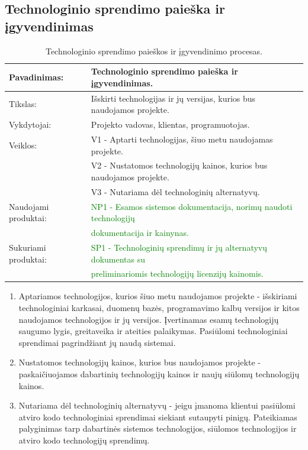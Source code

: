 \documentclass{VUMIFPSkursinis}
\begin{document}
	\subsection{Technologinio sprendimo paieška ir įgyvendinimas}
	\begin{center}
		\begin{table}[ht]
			\caption{Technologinio sprendimo paieškos ir įgyvendinimo procesas.}
			\begin{tabular}{ | l | l | }
				\hline
				Pavadinimas:		& Technologinio sprendimo paieška ir įgyvendinimas.									\\ \hline
				Tikslas:		& Išskirti technologijas ir jų versijas, kurios bus naudojamos projekte. 						\\ \hline
				Vykdytojai:		& Projekto vadovas, klientas, programuotojas.										\\ \hline
				Veiklos:		& V1 - Aptarti technologijas, šiuo metu naudojamas projekte. 								\\
							& V2 - Nustatomos technologijų kainos, kurios bus naudojamos projekte.							\\
							& V3 - Nutariama dėl technologinių alternatyvų.										\\ \hline
				Naudojami produktai:	& \textcolor{green}{NP1 - Esamos sistemos dokumentacija, norimų naudoti technologijų} \\& \textcolor{green}{dokumentacija ir kainynas. 	}		\\ \hline
				Sukuriami produktai:	& \textcolor{green}{SP1 - Technologinių sprendimų ir jų alternatyvų dokumentas su} \\& \textcolor{green}{preliminariomis technologijų licenzijų kainomis.}	\\ \hline
			\end{tabular}
		\end{table}
	\end{center}
	\newpage
	\begin{enumerate}
		\item{
			Aptariamos technologijos, kurios šiuo metu naudojamos projekte - išskiriami technologiniai karkasai, duomenų bazės, programavimo kalbų versijos ir kitos naudojamos technologijos ir jų versijos.
			Įvertinamas esamų technologijų saugumo lygis, greitaveika ir ateities palaikymas.
			Pasiūlomi technologiniai sprendimai pagrindžiant jų naudą sistemai.
		}
		\item{Nustatomos technologijų kainos, kurios bus naudojamos projekte - paskaičiuojamos dabartinių technologijų kainos ir naujų siūlomų technologijų kainos.}
		\item{
			Nutariama dėl technologinių alternatyvų - jeigu įmanoma klientui pasiūlomi atviro kodo technologiniai sprendimai siekiant sutaupyti pinigų.
			Pateikiamas palyginimas tarp dabartinės sistemos technologijos, siūlomos technologijos ir atviro kodo technologijų sprendimų.
		}
	\end{enumerate}
\end{document}
